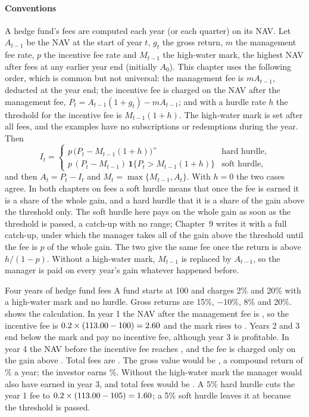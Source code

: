 \begin{chapterrefs}
\paragraph{Conventions}
A hedge fund's fees are computed each year (or each quarter) on its NAV. Let $A_{t-1}$ be the NAV at the
start of year $t$, $g_t$ the gross return, $m$ the management fee rate, $p$ the incentive fee rate and
$M_{t-1}$ the high-water mark, the highest NAV after fees at any earlier year end (initially $A_0$). This
chapter uses the following order, which is common but not universal: the management fee is $m A_{t-1}$,
deducted at the year end; the incentive fee is charged on the NAV after the management fee,
$P_t = A_{t-1}(1+g_t) - mA_{t-1}$; and with a hurdle rate $h$ the threshold for the incentive fee is
$M_{t-1}(1+h)$. The high-water mark is set after all fees, and the examples have no subscriptions or
redemptions during the year. Then
\begin{equation}\label{eq2:hffee}
  I_t = \begin{cases}
    p\,\bigl(P_t - M_{t-1}(1+h)\bigr)^{+} & \text{hard hurdle},\\[2pt]
    p\,(P_t - M_{t-1})\,\mathbf{1}\{P_t > M_{t-1}(1+h)\} & \text{soft hurdle},
  \end{cases}
\end{equation}
and then $A_t = P_t - I_t$ and $M_t = \max\{M_{t-1}, A_t\}$.
With $h = 0$ the two cases agree. In both chapters on fees a soft hurdle means that once the fee is
earned it is a share of the whole gain, and a hard hurdle that it is a share of the gain above the
threshold only. The soft hurdle here pays on the whole gain as soon as the threshold is passed, a
catch-up with no range; Chapter~9 writes it with a full catch-up, under which the manager takes all of
the gain above the threshold until the fee is $p$ of the whole gain. The two give the same fee once the
return is above $h/(1-p)$. Without a high-water mark, $M_{t-1}$ is replaced by $A_{t-1}$, so the
manager is paid on every year's gain whatever happened before.

\begin{example}{Four years of hedge fund fees}\label{ex2:hf}
A fund starts at 100 and charges 2\% and 20\% with a high-water mark and no hurdle. Gross returns are
15\%, $-10\%$, 8\% and 20\%.  shows the calculation. In year 1 the NAV after the
management fee is \hfPreOne, so the incentive fee is $0.2\times(113.00-100) = 2.60$ and the mark
rises to \hfHwmOne. Years 2 and 3 end below the mark and pay no incentive fee, although year 3 is
profitable. In year 4 the NAV before the incentive fee reaches \hfPreFour, and the fee is charged only
on the gain above \hfHwmThree. Total fees are \hfTotalFees. The gross value would be \hfGrossEnd, a
compound return of \hfGrossCagr\% a year; the investor earns \hfNetCagr\%. Without the high-water mark
the manager would also have earned \hfNoHwmIncThree{} in year 3, and total fees would be
\hfNoHwmTotal. A 5\% hard hurdle cuts the year 1 fee to $0.2\times(113.00-105) = 1.60$; a
5\% soft hurdle leaves it at \hfSoftIncOne{} because the threshold is passed.
\end{example}


\end{chapterrefs}
